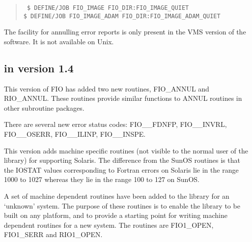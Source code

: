 \begin{quote}{\tt
\$ DEFINE/JOB FIO\_IMAGE FIO\_DIR:FIO\_IMAGE\_QUIET \\
\$ DEFINE/JOB FIO\_IMAGE\_ADAM FIO\_DIR:FIO\_IMAGE\_ADAM\_QUIET
}
\end{quote}

The facility for annulling error reports is only present in the VMS version of
the software. It is not available on Unix.

\subsection{in version 1.4}

This version of FIO has added two new routines, FIO\_ANNUL and RIO\_ANNUL.
These routines provide similar functions to ANNUL routines in other subroutine
packages.

There are several new error status codes: FIO\_\-\_\-FDNFP, FIO\_\-\_\-INVRL,
FIO\_\-\_\-OSERR, FIO\_\-\_\-ILINP, FIO\_\-\_\-INSPE.

This version adds machine specific routines (not visible to the normal user of
the library) for supporting Solaris. The difference from the SunOS routines is
that the IOSTAT values corresponding to Fortran errors on Solaris lie in the
range 1000 to 1027 whereas they lie in the range 100 to 127 on SunOS.

A set of machine dependent routines have been added to the library for an
`unknown' system. The purpose of these routines is to enable the library to be
built on any platform, and to provide a starting point for writing machine
dependent routines for a new system. The routines are FIO1\_\-OPEN,
FIO1\_\-SERR and RIO1\_\-OPEN.


